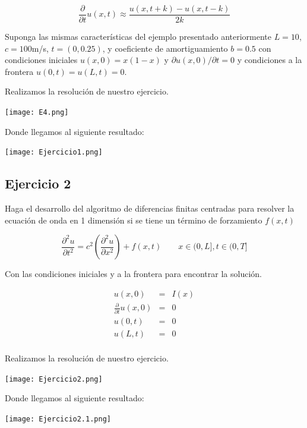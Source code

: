 \documentclass[12pt]{article}
\begin{document}
\begin{equation*}
\frac{\partial}{\partial t} u(x,t) \approx \frac{u(x,t+k) - u(x,t-k)}{2k}
\end{equation*}

Suponga las mismas características del ejemplo presentado anteriormente $L=10$, $c=100$m/s, $t=(0,0.25)$, y coeficiente de amortiguamiento $b=0.5$ con condiciones iniciales $u(x,0) = x(1-x)$ y $\partial u(x,0) / \partial t = 0$ y condiciones a la frontera $u(0,t)=u(L,t)=0$. 

Realizamos la resolución de nuestro ejercicio.

\begin{center}
    \texttt{[image: E4.png]}
    
    Donde llegamos al siguiente resultado:
    
    \texttt{[image: Ejercicio1.png]}
\end{center}






\subsection*{Ejercicio 2}

Haga el desarrollo del algoritmo de diferencias finitas centradas para resolver la ecuación de onda en 1 dimensión si se tiene un término de forzamiento $f(x,t)$

\begin{equation*}
\frac{\partial^2 u}{\partial t^2} = c^2 \left( 
  \frac{\partial^2 u}{\partial x^2}
   \right) + f(x,t) \qquad x \in (0,L], t \in (0,T]
\end{equation*}

Con las condiciones iniciales y a la frontera para encontrar la solución.

\begin{eqnarray*}
u(x,0) & = & I(x) \\
\frac{\partial}{\partial t} u(x,0) & = & 0 \\
u(0,t) & = & 0 \\
u(L,t) & = & 0 \\
\end{eqnarray*}

Realizamos la resolución de nuestro ejercicio.

\begin{center}
    \texttt{[image: Ejercicio2.png]}
    
    Donde llegamos al siguiente resultado:
    
    \texttt{[image: Ejercicio2.1.png]}
\end{center}
\end{document}
